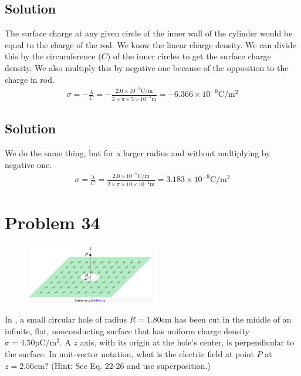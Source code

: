 \documentclass[12pt]{article}
\begin{document}
\subsection{Solution}
The surface charge at any given circle of the inner wall of the cylinder would be equal to the charge of the rod. We know the linear charge density. We can divide this by the circumference ($C$) of the inner circles to get the surface charge density. We also multiply this by negative one because of the opposition to the charge in rod.
\begin{gather*}
    \sigma  =   -\frac{\lambda}{C}
        =   -\frac{2.0 \times 10^{-9}\unit{\coulomb/\meter}}{2\times \pi \times 5 \times 10^{-2} \unit{\meter}}
        =   \boxed{-6.366 \times 10^{-9} \unit{\coulomb/\meter^2}}
\end{gather*}

\subsection{Solution}
We do the same thing, but for a larger radius and without multiplying by negative one. 
\begin{gather*}
    \sigma  =   \frac{\lambda}{C}
        =   \frac{2.0 \times 10^{-9}\unit{\coulomb/\meter}}{2\times \pi \times 10 \times 10^{-2} \unit{\meter}}
        =   \boxed{3.183 \times 10^{-9} \unit{\coulomb/\meter^2}}
\end{gather*}

\pagebreak
\section{Problem 34}
\begin{figure}
    \vspace{-30pt}
    \includegraphics[width=0.5\textwidth]{picture_10.png} 
\end{figure}
In , a small circular hole of radius $R = 1.80 \unit{\centi\meter}$ has been cut in the middle of an infinite, flat, nonconducting surface that has uniform charge density $\sigma = 4.50 \unit{\pico\coulomb/\meter^2}$. A $z$ axis, with its origin at the hole's center, is perpendicular to the surface. In unit-vector notation, what is the electric field at point $P$ at $z = 2.56 \unit{\centi\meter}$? (Hint: See Eq. 22-26 and use superposition.)
\end{document}

